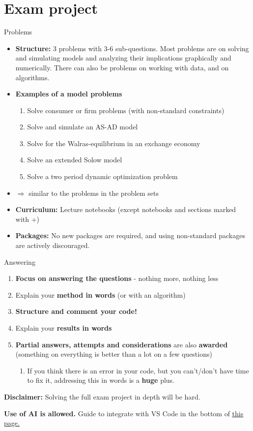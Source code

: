 \documentclass[10pt,english,t,aspectratio=169]{beamer}
\begin{document}
\section{Exam project}
\begin{frame}{Problems}
\begin{itemize}
\item \textbf{Structure:} 3 problems with 3-6 sub-questions. Most problems are on solving and
simulating models and analyzing their implications graphically and
numerically. There can also be problems on working with data, and on algorithms. 
\item \textbf{Examples of a model problems}
\begin{enumerate}
\item Solve consumer or firm problems (with non-standard constraints)
\item Solve and simulate an AS-AD model
\item Solve for the Walras-equilibrium in an exchange economy
\item Solve an extended Solow model
\item Solve a two period dynamic optimization problem
\end{enumerate}
\item []$\Rightarrow$ similar to the problems in the problem sets
\item \textbf{Curriculum: }Lecture notebooks\textbf{ }(except notebooks and sections
marked with +)
\item \textbf{Packages: }No new packages are required, and using non-standard
packages are actively discouraged.
\end{itemize}
\end{frame}
%
\begin{frame}{Answering}
\begin{enumerate}
\item \textbf{Focus on answering the questions} - nothing more, nothing
less
\item Explain your \textbf{method in words }(or with an algorithm)
\item \textbf{Structure and comment your code!}
\item Explain your \textbf{results in words}
\item \textbf{Partial answers, attempts and considerations} are also \textbf{awarded
}(something on everything is better than a lot on a few questions)
\begin{enumerate}[-]
    \item If you think there is an error in your code, but you can't/don't have time to fix it, addressing this in words is a \textbf{huge} plus.
\end{enumerate}
\end{enumerate}
\textbf{Disclaimer: }Solving the full exam project in depth will be
hard. \par 
\textbf{Use of AI is allowed.} Guide to integrate with VS Code in the bottom of \underline{\href{https://sites.google.com/view/numeconcph-introprog/guides/installation}{this page}.}
\end{frame}
\end{document}

